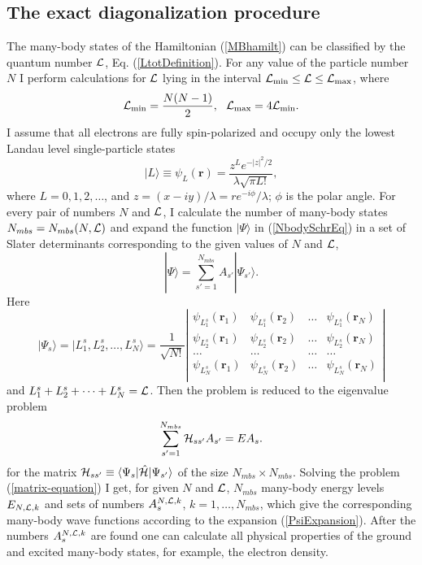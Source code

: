 \documentclass[aps,prb,10pt%
]{revtex4-2}
\def\be{\begin{equation}}
\def\ee{\end{equation}}
\begin{document}
\subsection{The exact diagonalization procedure\label{sec:EDprocedure}}

The many-body states of the Hamiltonian (\ref{MBhamilt}) can be classified by the quantum number ${\cal L}$, Eq. (\ref{LtotDefinition}). For any value of the particle number $N$ I perform calculations for ${\cal L}$ lying in the interval ${\cal L}_{\min}\le {\cal L}\le {\cal L}_{\max}$, where 
\be 
{\cal L}_{\min}=\frac{N(N-1)}{2},\ \ {\cal L}_{\max}=4{\cal L}_{\min}.
\label{MinMaxMomenta}
\ee
I assume that all electrons are fully spin-polarized and occupy only the lowest Landau level single-particle states
\be
|L\rangle\equiv \psi_L({\bm r})= \frac{z^{L} e^{-|z|^2/2}}{\lambda\sqrt{\pi L!}} ,
\label{spwf_psiL}
\ee
where $L=0,1,2,\dots $, and $z=(x-iy)/\lambda=re^{-i\phi}/\lambda$; $\phi$ is the polar angle. For every pair of numbers $N$ and ${\cal L}$, I calculate the number of many-body states $N_{mbs}=N_{mbs}(N,{\cal L})$ and expand the function $|\Psi\rangle$ in (\ref{NbodySchrEq}) in a set of Slater determinants corresponding to the given values of $N$ and ${\cal L}$, 
\be 
|\Psi\rangle =\sum_{s'=1}^{N_{mbs}} A_{s'} |\Psi_{s'}\rangle.
\label{PsiExpansion}
\ee
Here
\be 
|\Psi_{s}\rangle=|L_1^s,L_2^s,\dots,L_N^s\rangle=
\frac{1}{\sqrt{N!}}
\left |\begin{array}{cccc}
\psi_{L_1^s}(\bm r_1) & 
\psi_{L_1^s}(\bm r_2) & 
\dots &
\psi_{L_1^s}(\bm r_N) \\
\psi_{L_2^s}(\bm r_1) & 
\psi_{L_2^s}(\bm r_2) &
\dots & 
\psi_{L_2^s}(\bm r_N) \\
\dots &\dots &\dots &\dots \\
\psi_{L_N^s}(\bm r_1) & 
\psi_{L_N^s}(\bm r_2) & 
\dots & 
\psi_{L_N^s}(\bm r_N) \\
\end{array}
\right |
\label{manybodyWF}
\ee
and $L_1^s+L_2^s+\dots+L_N^s={\cal L}$. Then the problem is reduced to the eigenvalue problem 
\be 
\sum_{s'=1}^{N_{mbs}} {\cal H}_{ss'}A_{s'}=EA_{s}.
\label{matrix-equation}
\ee
for the matrix ${\cal H}_{ss'}\equiv \langle \Psi_{s}|\hat {\cal H}|\Psi_{s'}\rangle$ of the size $N_{mbs}\times N_{mbs}$. Solving the problem (\ref{matrix-equation}) I get, for given $N$ and ${\cal L}$, $N_{mbs}$ many-body energy levels $E_{N,{\cal L},k}$ and sets of numbers $A_{s}^{N,{\cal L},k}$, $k=1,\dots,N_{mbs}$, which give the corresponding many-body wave functions according to the expansion (\ref{PsiExpansion}). After the numbers $A_{s}^{N,{\cal L},k}$ are found one can calculate all physical properties of the ground and excited many-body states, for example, the electron density.
\end{document}
